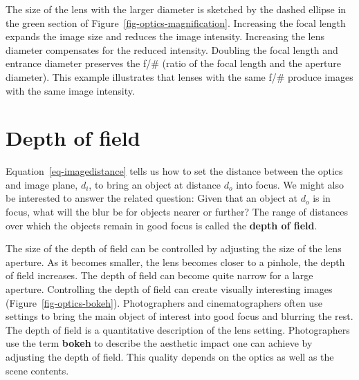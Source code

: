 \documentclass[
  letterpaper,
]{book}
\begin{document}
The size of the lens with the larger diameter is sketched by the dashed
ellipse in the green section of Figure~\ref{fig-optics-magnification}.
Increasing the focal length expands the image size and reduces the image
intensity. Increasing the lens diameter compensates for the reduced
intensity. Doubling the focal length and entrance diameter preserves the
f/\# (ratio of the focal length and the aperture diameter). This example
illustrates that lenses with the same f/\# produce images with the same
image intensity.

\section{Depth of field}\label{sec-optics-dof}

Equation~\ref{eq-imagedistance} tells us how to set the distance between
the optics and image plane, \(d_i\), to bring an object at distance
\(d_o\) into focus. We might also be interested to answer the related
question: Given that an object at \(d_o\) is in focus, what will the
blur be for objects nearer or further? The range of distances over which
the objects remain in good focus is called the \textbf{depth of field}.

The size of the depth of field can be controlled by adjusting the size
of the lens aperture. As it becomes smaller, the lens becomes closer to
a pinhole, the depth of field increases. The depth of field can become
quite narrow for a large aperture. Controlling the depth of field can
create visually interesting images (Figure~\ref{fig-optics-bokeh}).
Photographers and cinematographers often use settings to bring the main
object of interest into good focus and blurring the rest. The depth of
field is a quantitative description of the lens setting. Photographers
use the term \textbf{bokeh} to describe the aesthetic impact one can
achieve by adjusting the depth of field. This quality depends on the
optics as well as the scene contents.
\end{document}
